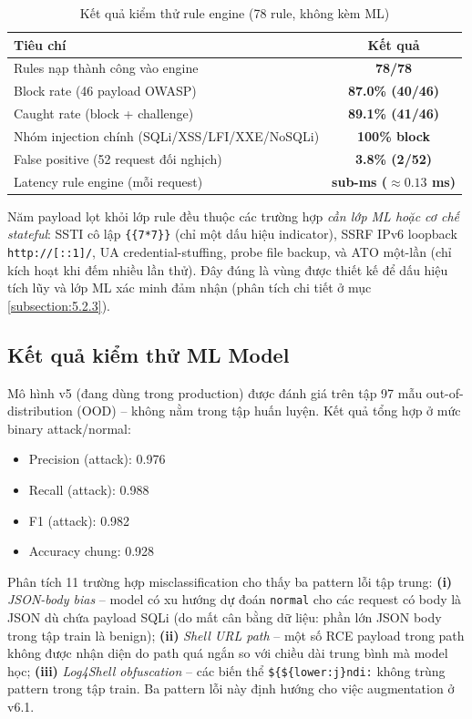 \documentclass[../DoAn.tex]{subfiles}
\begin{document}
\begin{table}[h!]
\centering
\caption{Kết quả kiểm thử rule engine (78 rule, không kèm ML)}
\label{table:rule-test-results}
\small
\begin{tabular}{|l|c|}
\hline
\textbf{Tiêu chí} & \textbf{Kết quả} \\
\hline
Rules nạp thành công vào engine & \textbf{78/78} \\
\hline
Block rate (46 payload OWASP) & \textbf{87.0\% (40/46)} \\
\hline
Caught rate (block + challenge) & \textbf{89.1\% (41/46)} \\
\hline
Nhóm injection chính (SQLi/XSS/LFI/XXE/NoSQLi) & \textbf{100\% block} \\
\hline
False positive (52 request đối nghịch) & \textbf{3.8\% (2/52)} \\
\hline
Latency rule engine (mỗi request) & \textbf{sub-ms (\(\approx 0.13\) ms)} \\
\hline
\end{tabular}
\end{table}

Năm payload lọt khỏi lớp rule đều thuộc các trường hợp \textit{cần lớp ML hoặc
cơ chế stateful}: SSTI cô lập \texttt{\{\{7*7\}\}} (chỉ một dấu hiệu indicator),
SSRF IPv6 loopback \texttt{http://[::1]/}, UA credential-stuffing, probe file
backup, và ATO một-lần (chỉ kích hoạt khi đếm nhiều lần thử). Đây đúng là vùng
được thiết kế để dấu hiệu tích lũy và lớp ML xác minh đảm nhận (phân tích chi
tiết ở mục \ref{subsection:5.2.3}).

\subsection{Kết quả kiểm thử ML Model}
\label{subsection:4.6.3}

Mô hình v5 (đang dùng trong production) được đánh giá trên tập 97 mẫu
out-of-distribution (OOD) -- không nằm trong tập huấn luyện. Kết quả tổng
hợp ở mức binary attack/normal:

\begin{itemize}[leftmargin=*]
    \item Precision (attack): 0.976
    \item Recall (attack): 0.988
    \item F1 (attack): 0.982
    \item Accuracy chung: 0.928
\end{itemize}

Phân tích 11 trường hợp misclassification cho thấy ba pattern lỗi tập
trung: \textbf{(i)} \textit{JSON-body bias} -- model có xu hướng dự đoán
\texttt{normal} cho các request có body là JSON dù chứa payload SQLi
(do mất cân bằng dữ liệu: phần lớn JSON body trong tập train là benign);
\textbf{(ii)} \textit{Shell URL path} -- một số RCE payload trong path
không được nhận diện do path quá ngắn so với chiều dài trung bình mà
model học; \textbf{(iii)} \textit{Log4Shell obfuscation} -- các biến
thể \texttt{\$\{\$\{lower:j\}ndi:} không trùng pattern trong tập train.
Ba pattern lỗi này định hướng cho việc augmentation ở v6.1.
\end{document}
